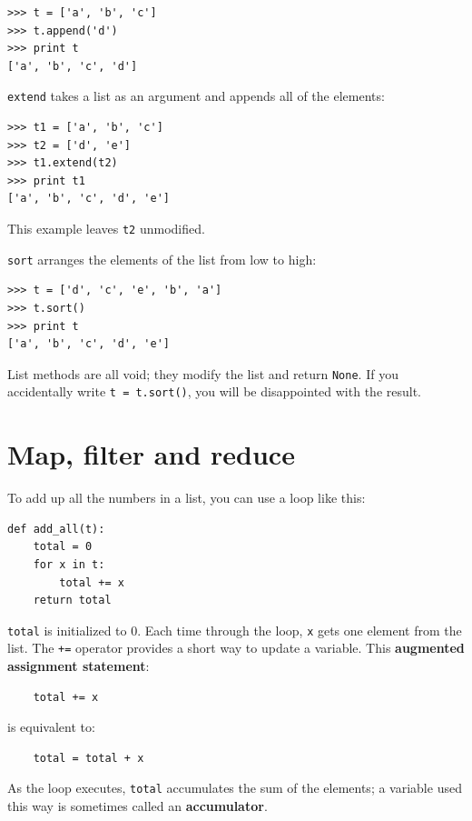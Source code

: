 \documentclass[10pt]{book}
\begin{document}
\begin{verbatim}
>>> t = ['a', 'b', 'c']
>>> t.append('d')
>>> print t
['a', 'b', 'c', 'd']
\end{verbatim}
%
{\tt extend} takes a list as an argument and appends all of
the elements:

\begin{verbatim}
>>> t1 = ['a', 'b', 'c']
>>> t2 = ['d', 'e']
>>> t1.extend(t2)
>>> print t1
['a', 'b', 'c', 'd', 'e']
\end{verbatim}
%
This example leaves {\tt t2} unmodified.

{\tt sort} arranges the elements of the list from low to high:

\begin{verbatim}
>>> t = ['d', 'c', 'e', 'b', 'a']
>>> t.sort()
>>> print t
['a', 'b', 'c', 'd', 'e']
\end{verbatim}
%
List methods are all void; they modify the list and return {\tt None}.
If you accidentally write {\tt t = t.sort()}, you will be disappointed
with the result.


\section{Map, filter and reduce}

To add up all the numbers in a list, you can use a loop like this:


\begin{verbatim}
def add_all(t):
    total = 0
    for x in t:
        total += x
    return total
\end{verbatim}
%
{\tt total} is initialized to 0.  Each time through the loop,
{\tt x} gets one element from the list.  The {\tt +=} operator
provides a short way to update a variable.  This
{\bf augmented assignment statement}:

\begin{verbatim}
    total += x
\end{verbatim}
%
is equivalent to:

\begin{verbatim}
    total = total + x
\end{verbatim}
%
As the loop executes, {\tt total} accumulates the sum of the
elements; a variable used this way is sometimes called an
{\bf accumulator}.
\end{document}
